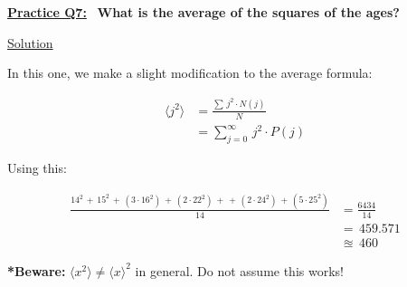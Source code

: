 
\underline{\textbf{Practice Q7:}} \ \textbf{What is the average of the squares of the ages?}

\bigskip

\underline{Solution}

In this one, we make a slight modification to the average formula:

\begin{align*}
    \langle j^{2} \rangle &= \frac{\sum \, j^{2} \cdot N(j)}{N} \\[1.5ex]
    &= \sum_{j=0}^{\infty} \, j{^2} \cdot P(j)
\end{align*}

Using this:

\begin{align*}
    \frac{14^{2} \, + \, 15^{2} \, + \, (3 \cdot 16^{2}) \, + \, (2 \cdot 22^{2}) \, + \,
    + \, (2 \cdot 24^{2}) \, + \, (5 \cdot 25^{2})}{14} &= \frac{6434}{14} \\[1.5ex]
    &= \, 459.571 \\[1.5ex]
    &\approxeq \, \boxed{460}
\end{align*}

\bigskip

\textbf{*Beware:} $ \langle x^{2} \rangle \neq \langle x \rangle^{2}$ in general. Do not assume this works!